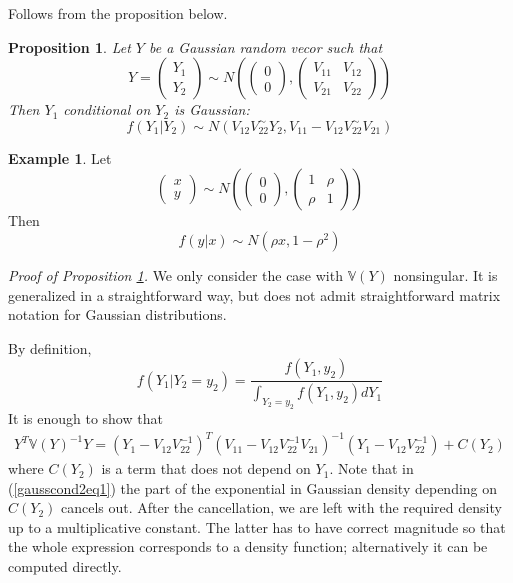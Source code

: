 \documentclass[12pt]{article}
\newtheorem{proposition}[theorem]{Proposition}
\theoremstyle{definition}
\newtheorem{example}[theorem]{Example}
\theoremstyle{remark}
\numberwithin{equation}{section}
\newcommand{\VV}{\mathbb{V}}
\begin{document}
\proof Follows from the proposition below.

\begin{proposition}\label{gausscond2}
	Let $Y$ be a Gaussian random vecor such that
	\begin{equation*}
		Y = \begin{pmatrix}
			Y_1\\Y_2
	\end{pmatrix}\sim
	N\left(
	\begin{pmatrix}
		0\\0
	\end{pmatrix},
	\begin{pmatrix}
		V_{11} & V_{12}\\V_{21} & V_{22}
	\end{pmatrix}
	\right)
	\end{equation*}
	Then $Y_1$ conditional on $Y_2$ is Gaussian:
	\begin{equation*}
		f(Y_1|Y_2) \sim N(V_{12}V_{22}^{\sim}Y_2, V_{11} - V_{12}V_{22}^{\sim}V_{21})
	\end{equation*}
\end{proposition}
\begin{example}
Let
	\begin{equation*}
		\begin{pmatrix}
			x\\y
	\end{pmatrix}\sim
	N\left(
	\begin{pmatrix}
		0\\0
	\end{pmatrix},
	\begin{pmatrix}
		1 & \rho\\ \rho & 1
	\end{pmatrix}
	\right)
	\end{equation*}
	Then
	\begin{equation*}
			f(y|x) \sim N(\rho x, 1 - \rho^2)
	\end{equation*}
\end{example}
\noindent\emph{Proof of Proposition \ref{gausscond2}.} We only consider the case with $\VV(Y)$ nonsingular. It is generalized in a straightforward way, but does not admit straightforward matrix notation for Gaussian distributions.

By definition,
\begin{equation}\label{gausscond2eq1}
	f(Y_1|Y_2=y_2) = \frac{f(Y_1,y_2)}{\int_{Y_2 = y_2}f(Y_1, y_2)dY_1}
\end{equation}
It is enough to show that
\begin{align}\label{gausscond2eq2}
	Y^T\VV(Y)^{-1}Y = (Y_1 - V_{12}V_{22}^{-1})^T(V_{11}  - V_{12}V_{22}^{-1}V_{21})^{-1}(Y_1 - V_{12}V_{22}^{-1}) + C(Y_2)
\end{align}
where $C(Y_2)$ is a term that does not depend on $Y_1$. Note that in (\ref{gausscond2eq1}) the part of the exponential in Gaussian density depending on $C(Y_2)$ cancels out. After the cancellation, we are left with the required density up to a multiplicative constant. The latter has to have correct magnitude so that the whole expression corresponds to a density function; alternatively it can be computed directly.
\end{document}
